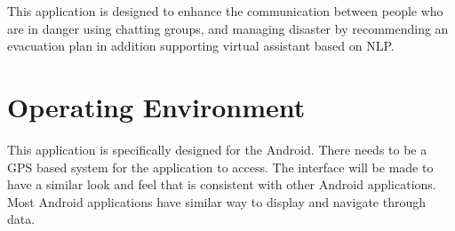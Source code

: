 \documentclass{scrreprt}
\begin{document}
This application is designed to enhance the communication between people who are in danger using chatting groups, and managing disaster by recommending an evacuation plan in addition supporting virtual assistant based on NLP.



\section{Operating Environment}

This application is specifically designed for the Android. There needs to be a GPS based system for the application to access. The interface will be made to have a similar look and feel that is consistent with other Android applications. Most Android applications have similar way to display and navigate through data.


\end{document}

